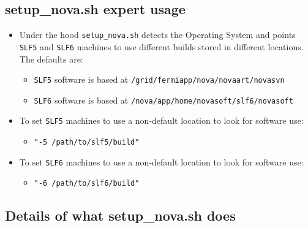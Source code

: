 \documentclass[letterpaper,10pt]{article}
\begin{document}
\subsection{setup\_nova.sh expert usage}
\begin{itemize}
\item Under the hood \verb|setup_nova.sh| detects the Operating System and points \verb|SLF5| and \verb|SLF6| machines to use different builds stored in different locations. The defaults are:
  \begin{itemize}
  \item \verb|SLF5| software is based at \verb|/grid/fermiapp/nova/novaart/novasvn|
  \item \verb|SLF6| software is based at \verb|/nova/app/home/novasoft/slf6/novasoft|
  \end{itemize}
\item To set \verb|SLF5| machines to use a non-default location to look for software use:
\begin{itemize}
  \item \verb|"-5 /path/to/slf5/build"|
  \end{itemize}
\item To set \verb|SLF6| machines to use a non-default location to look for software use:
\begin{itemize}
  \item \verb|"-6 /path/to/slf6/build"|
  \end{itemize}
\end{itemize}

\subsection{Details of what setup\_nova.sh does}
\end{document}
